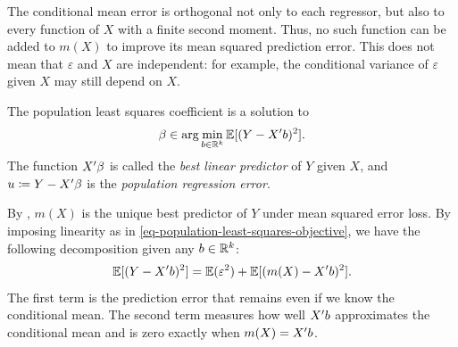 \documentclass[a4paper,12pt]{article}
\begin{document}
\begin{remark}
	The conditional mean error is orthogonal not only to each regressor,
	but also to every function of $X$ with a finite second moment.
	Thus, no such function can be added to $m(X)$ to improve its mean squared prediction error.
	This does not mean that $\varepsilon$ and $X$ are independent:
	for example, the conditional variance of $\varepsilon$ given $X$ may still depend on $X$.
\end{remark}

\begin{definition}\label{def-best-linear-predictor}
	The population least squares coefficient is a solution to
	\begin{align}\label{eq-population-least-squares-objective}
		\beta\in\arg\min_{b\in\mathbb{R}^k}\operatorname{\mathbb{E}}[(Y-X^{\prime} b)^2].
	\end{align}
	The function $X^{\prime}\beta$ is called the \emph{best linear predictor} of $Y$ given $X$,
	and $u\coloneqq Y-X^{\prime}\beta$ is the \emph{population regression error}.
\end{definition}

\begin{remark}
	By , $m(X)$ is the unique best predictor of $Y$ under mean squared error loss.
	By imposing linearity as in \eqref{eq-population-least-squares-objective},
	we have the following decomposition given any $b\in\mathbb{R}^k$:
	\begin{align}\label{eq-linear-prediction-decomposition}
		\operatorname{\mathbb{E}}[(Y-X^{\prime} b)^2]
		=\operatorname{\mathbb{E}}(\varepsilon^2)+\operatorname{\mathbb{E}}[(m(X)-X^{\prime} b)^2].
	\end{align}
	The first term is the prediction error that remains even if we know the conditional mean.
	The second term measures how well $X^{\prime} b$ approximates the conditional mean
	and is zero exactly when $m(X)=X^{\prime} b$.
\end{remark}
\end{document}
